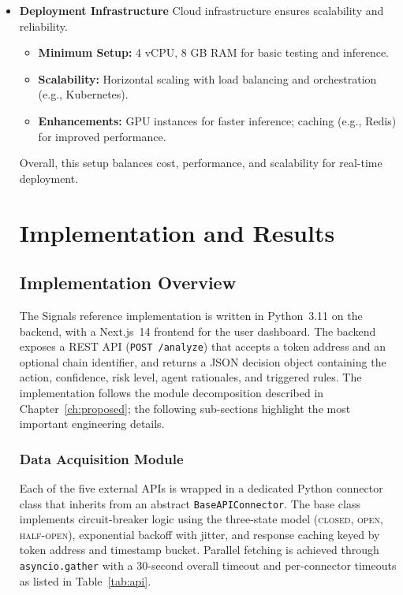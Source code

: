 \documentclass[12pt,a4paper,oneside,openany]{book}
\begin{document}
\begin{itemize}[leftmargin=8mm]
\item \textbf{Deployment Infrastructure}
Cloud infrastructure ensures scalability and reliability.

\begin{itemize}[leftmargin=8mm]
\item \textbf{Minimum Setup:} 4 vCPU, 8 GB RAM for basic testing and inference.
\item \textbf{Scalability:} Horizontal scaling with load balancing and orchestration (e.g., Kubernetes).
\item \textbf{Enhancements:} GPU instances for faster inference; caching (e.g., Redis) for improved performance.
\end{itemize}

Overall, this setup balances cost, performance, and scalability for real-time deployment.
\chapter{Implementation and Results}
\label{ch:impl}

\section{Implementation Overview}
The Signals reference implementation is written in Python~3.11 on the backend, with a Next.js~14 frontend for the user dashboard. The backend exposes a REST API (\texttt{POST /analyze}) that accepts a token address and an optional chain identifier, and returns a JSON decision object containing the action, confidence, risk level, agent rationales, and triggered rules. The implementation follows the module decomposition described in Chapter~\ref{ch:proposed}; the following sub-sections highlight the most important engineering details.

\subsection{Data Acquisition Module}
Each of the five external APIs is wrapped in a dedicated Python connector class that inherits from an abstract \texttt{BaseAPIConnector}. The base class implements circuit-breaker logic using the three-state model (\textsc{closed}, \textsc{open}, \textsc{half-open}), exponential backoff with jitter, and response caching keyed by token address and timestamp bucket. Parallel fetching is achieved through \texttt{asyncio.gather} with a 30-second overall timeout and per-connector timeouts as listed in Table~\ref{tab:api}.


\end{itemize}
\end{document}
